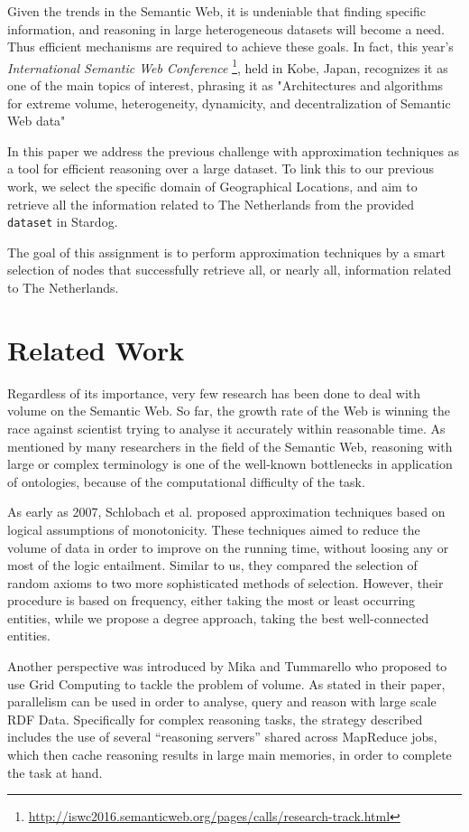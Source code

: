 \documentclass[runningheads,a4paper]{../../StyleFiles/llncs}
\begin{document}
Given the trends in the Semantic Web, it is undeniable that finding specific information, and reasoning in large heterogeneous datasets will become a need. Thus efficient mechanisms are required to achieve these goals. In fact, this year's \textit{International Semantic Web Conference} \footnote{\url{http://iswc2016.semanticweb.org/pages/calls/research-track.html}}, held in Kobe, Japan, recognizes it as one of the main topics of interest, phrasing it as "Architectures and algorithms for extreme volume, heterogeneity, dynamicity, and decentralization of Semantic Web data"

In this paper we address the previous challenge with approximation techniques as a tool for efficient reasoning over a large dataset. To link this to our previous work, we select the specific domain of Geographical Locations, and aim to retrieve all the information related to The Netherlands from the provided \texttt{dataset} in Stardog.  

The goal of this assignment is to perform approximation techniques by a smart selection of nodes that successfully retrieve all, or nearly all, information related to The Netherlands. 

\section{Related Work}
Regardless of its importance, very few research has been done to deal with volume on the Semantic Web. So far, the growth rate of the Web is winning the race against scientist trying to analyse it accurately within reasonable time. As mentioned by many researchers in the field of the Semantic Web, reasoning with large or complex terminology is one of the well-known bottlenecks in application of ontologies, because of the computational difficulty of the task.

As early as 2007, Schlobach et al. \cite{schlobach2007anytime} proposed approximation techniques based on logical assumptions of monotonicity. These techniques aimed to reduce the volume of data in order to improve on the running time, without loosing any or most of the logic entailment. Similar to us, they compared the selection of random axioms to two more sophisticated methods of selection. However, their procedure is based on frequency, either taking the most or least occurring entities, while we propose a degree approach, taking the best well-connected entities.

Another perspective was introduced by Mika and Tummarello \cite{mika2008web} who proposed to use Grid Computing to tackle the problem of volume. As stated in their paper, parallelism can be used in order to analyse, query and reason with large scale RDF Data. Specifically for complex reasoning tasks, the strategy described includes the use of several “reasoning servers” shared across MapReduce jobs, which then cache reasoning results in large main memories, in order to complete the task at hand.
\end{document}
